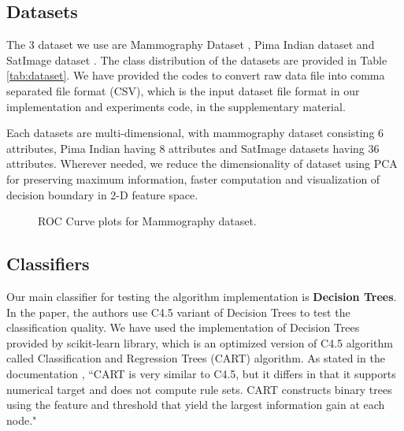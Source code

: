\documentclass[10pt,journal,compsoc]{IEEEtran}
\begin{document}
\subsection{Datasets}
The 3 dataset we use are Mammography Dataset \cite{mammo}, Pima Indian dataset \cite{pima} and SatImage dataset \cite{satimg}.
The class distribution of the datasets are provided in Table \ref{tab:dataset}.
We have provided the codes to convert raw data file into comma separated file format (CSV), which is the input dataset file format in our implementation and experiments code, in the supplementary material. 

Each datasets are multi-dimensional, with mammography dataset consisting 6 attributes, Pima Indian having 8 attributes and SatImage datasets having 36 attributes.
Wherever needed, we reduce the dimensionality of dataset using PCA for preserving maximum information, faster computation and visualization of decision boundary in 2-D feature space.
\begin{figure}[!b]
\centering
{}
\hfil
{}
\hfil
\caption{ROC Curve plots for Mammography dataset.}
\label{fig:mammo}
\end{figure}

\subsection{Classifiers}
Our main classifier for testing the algorithm implementation is \textbf{Decision Trees}.
In the paper, the authors use C4.5 variant of Decision Trees to test the classification quality.
We have used the implementation of Decision Trees provided by scikit-learn library, which is an optimized version of C4.5 algorithm called Classification and Regression Trees (CART) algorithm.
As stated in the documentation \cite{dtree}, ``CART is very similar to C4.5, but it differs in that it supports numerical target and does not compute rule sets. 
CART constructs binary trees using the feature and threshold that yield the largest information gain at each node."
\end{document}
